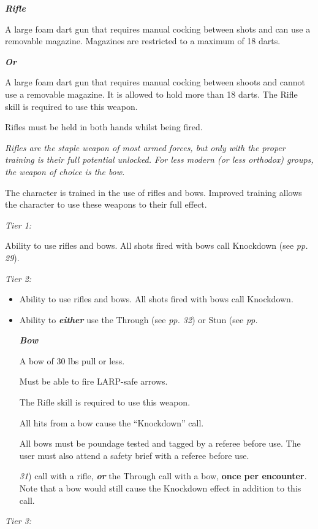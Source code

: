\documentclass{scrbook}
\begin{document}
\textbf{\textit{Rifle}}

A large foam dart gun that requires manual cocking between shots and can use a removable magazine. Magazines are restricted to a maximum of 18 darts.

\textbf{\textit{Or}}

A large foam dart gun that requires manual cocking between shoots and cannot use a removable magazine. It is allowed to hold more than 18 darts. The Rifle skill is required to use this weapon.

Rifles must be held in both hands whilst being fired.

\textit{Rifles are the staple weapon of most armed forces, but only with the proper training is their full potential unlocked. For less modern (or less orthodox) groups, the weapon of choice is the bow.}

The character is trained in the use of rifles and bows. Improved training allows the character to use these weapons to their full effect.

\textit{Tier 1:}

Ability to use rifles and bows. All shots fired with bows call Knockdown (see \textit{pp. 29}).

\textit{Tier 2:}

\begin{itemize}
\item Ability to use rifles and bows. All shots fired with bows call Knockdown.

\item Ability to \textbf{\textit{either}} use the Through (see \textit{pp. 32}) or Stun (see \textit{pp.}

\textbf{\textit{Bow}}

A bow of 30 lbs pull or less.

Must be able to fire LARP-safe arrows.

The Rifle skill is required to use this weapon.

All hits from a bow cause the ``Knockdown'' call.

All bows must be poundage tested and tagged by a referee before use. The user must also attend a safety brief with a referee before use.

\textit{31}) call with a rifle, \textbf{\textit{or}} the Through call with a bow, \textbf{once per encounter}. Note that a bow would still cause the Knockdown effect in addition to this call.

\end{itemize}
\textit{Tier 3:}
\end{document}
